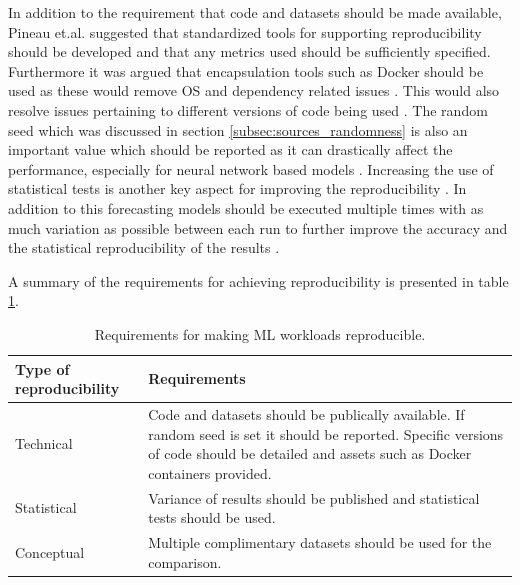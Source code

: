 In addition to the requirement that code and datasets should be made available, Pineau et.al. suggested that standardized tools for supporting reproducibility should be developed and that any metrics used should be sufficiently specified. Furthermore it was argued that encapsulation tools such as Docker should be used as these would remove OS and dependency related issues \cite{pineau2020improving}. This would also resolve issues pertaining to different versions of code being used \cite{beam2020challenges}. The random seed which was discussed in section \ref{subsec:sources_randomness} is also an important value which should be reported as it can drastically affect the performance, especially for neural network based models \cite{beam2020challenges, bouthillier2021accounting}. Increasing the use of statistical tests is another key aspect for improving the reproducibility \cite{mcdermott2019reproducibility}. In addition to this forecasting models should be executed multiple times with as much variation as possible between each run to further improve the accuracy and the statistical reproducibility of the results
\cite{bouthillier2021accounting}.

A summary of the requirements for achieving reproducibility is presented in table \ref{tab:reproducibility}.

\begin{table}[h]
  \centering
  \begin{tabularx}{\textwidth}{|l|X|}
    \hline
    Type of reproducibility & Requirements                                                                                                                                                                               \\
    \hline
    \hline
    Technical               & Code and datasets should be publically available. If random seed is set it should be reported. Specific versions of code should be detailed and assets such as Docker containers provided. \\
    \hline
    Statistical             & Variance of results should be published and statistical tests should be used.                                                                                                              \\
    \hline
    Conceptual              & Multiple complimentary datasets should be used for the comparison.                                                                                                                         \\
    \hline
  \end{tabularx}
  \caption{Requirements for making ML workloads reproducible.}
  \label{tab:reproducibility}
\end{table}


